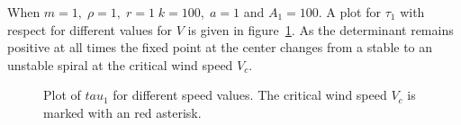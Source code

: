 When $m = 1, \; \rho = 1, \; r = 1 \; k = 100, \; a = 1$ and $A_1 = 100$. 
A plot for $\tau_1$ with respect for different values for $V$ is given in figure~\ref{fig:tau1}. As the determinant remains positive at all times the fixed point at the center changes from a stable to an unstable spiral at the critical wind speed $V_c$. 
\begin{figure}

\caption{Plot of $tau_1$ for different speed values. The critical wind speed $V_c$ is marked with an red asterisk.}
\label{fig:tau1}
\end{figure}






